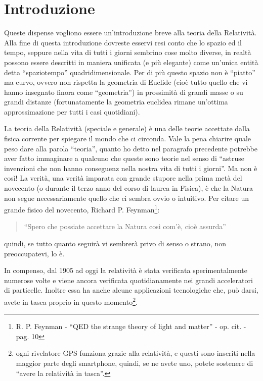 \chapter{Introduzione}

Queste dispense vogliono essere un'introduzione breve alla teoria della Relatività.
Alla fine di questa introduzione dovreste esservi resi conto che lo spazio ed il tempo, seppure nella vita di tutti i giorni sembrino cose
molto diverse, in realtà possono essere descritti in maniera unificata (e più elegante) come un'unica entità detta ``spaziotempo''
quadridimensionale. Per di più questo spazio non è ``piatto'' ma curvo, ovvero non rispetta la geometria di Euclide (cioè tutto quello che 
vi hanno insegnato finora come ``geometria'') in prossimità di grandi masse o su grandi distanze (fortunatamente la geometria euclidea rimane
un'ottima approssimazione per tutti i casi quotidiani).

La teoria della Relatività (speciale e generale) è una delle teorie accettate dalla fisica corrente per spiegare il mondo 
che ci circonda. Vale la pena chiarire quale peso dare alla parola ``teoria'', quanto ho detto nel paragrafo precedente potrebbe aver fatto 
immaginare a qualcuno che queste sono teorie nel senso di ``astruse invenzioni che non hanno conseguenz nella nostra vita di tutti i
giorni''. Ma non è così! La verità, una verità imparata con grande stupore nella prima metà del novecento (o durante il terzo anno
del corso di laurea in Fisica), è che la Natura non segue necessariamente quello che ci sembra ovvio o intuitivo. Per citare un grande 
fisico del novecento, Richard P. Feynman\footnote{R. P. Feynman - ``QED the strange theory of light and matter'' - op. cit. - pag. 10}:
\begin{quotation}
``Spero che possiate accettare la Natura così com'è, cioè assurda''
\end{quotation}
quindi, se tutto quanto seguirà vi sembrerà privo di senso o strano, non preoccupatevi, lo è. 

In compenso, dal 1905 ad oggi la relatività è stata verificata sperimentalmente numerose volte e viene ancora verificata  
quotidianamente nei grandi acceleratori di particelle. Inoltre essa ha anche alcune applicazioni tecnologiche che, può darsi, 
avete in tasca proprio in questo momento\footnote{ogni rivelatore GPS funziona grazie alla relatività, e questi sono 
inseriti nella maggior parte degli smartphone, quindi, se ne avete uno, potete sostenere di ``avere la relatività in tasca''.}.

